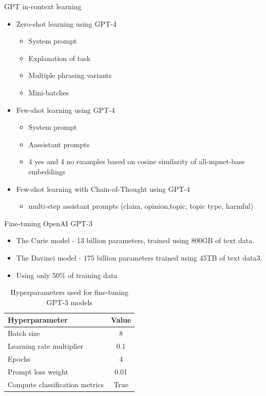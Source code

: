 \documentclass[aspectratio=149]{beamer}
\begin{document}
\begin{frame}{GPT in-context learning}
\begin{itemize}
  \item Zero-shot learning using GPT-4
  \begin{itemize}
  \item System prompt
  \item Explanation of task
  \item Multiple phrasing variants
  \item Mini-batches
\end{itemize}
  \item Few-shot learning using GPT-4
\begin{itemize}
  \item System prompt 
  \item Aassistant prompts
  \item 4 yes and 4 no examples based on cosine similarity of  all-mpnet-base embeddings
\end{itemize}
  \item Few-shot learning with Chain-of-Thought using GPT-4
  \begin{itemize}
  \item  multi-step assistant prompts (claim, opinion,topic, topic type, harmful)
\end{itemize}

\end{itemize}
\end{frame}
\begin{frame}{Fine-tuning OpenAI GPT-3}
\begin{itemize}
  \item The Curie model - 13 billion parameters, trained using 800GB of text data.
  \item The Davinci model - 175 billion parameters  trained using 45TB of text data3.
  \item Using only 50\% of training data
\end{itemize}

\begin{table}[h]
\centering

\label{tab:finetuning-hyperparams}
\begin{tabular}{lc}
        \toprule
        \textbf{Hyperparameter}        & \textbf{Value} \\
        \midrule
        Batch size                     & 8              \\ 
        Learning rate multiplier       & 0.1            \\ 
        Epochs                         & 4              \\ 
        Prompt loss weight             & 0.01           \\ 
        Compute classification metrics & True           \\ 
\bottomrule
    \end{tabular}
\caption{Hyperparameters used for fine-tuning GPT-3 models}
\end{table}
\end{frame}
\end{document}
